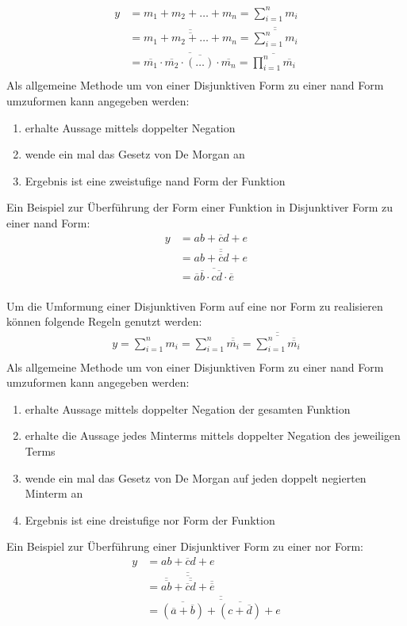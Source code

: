 \begin{align*}
	y &= m_1 + m_2 + \ldots + m_n = \sum_{i=1}^n m_i \\
	  &= \overline{\overline{m_1 + m_2 + \ldots + m_n}} = \overline{\overline{\sum_{i=1}^n m_i}} \\
	  &= \overline{\overline{m_1} \cdot \overline{m_2} \cdot \overline{(\ldots)} \cdot \overline{m_n}} 
	   = \overline{\prod_{i=1}^n \overline{m_i}} \\
\end{align*}
Als allgemeine Methode um von einer Disjunktiven Form zu einer {\sc nand} Form umzuformen kann angegeben werden:
\begin{enumerate}
  \item erhalte Aussage mittels doppelter Negation
  \item wende ein mal das Gesetz von De Morgan an
  \item Ergebnis ist eine zweistufige {\sc nand} Form der Funktion
\end{enumerate}
Ein Beispiel zur Überführung der Form einer Funktion in Disjunktiver Form zu einer {\sc nand} Form: 
\begin{align*}
	y &= ab + \overline{c}d + e \\
	  &= \overline{\overline{ab + \overline{c}d + e}} \\
	  &= \overline{\overline{a}\overline{b} \cdot c\overline{d} \cdot \overline{e}} \\
\end{align*}

Um die Umformung einer Disjunktiven Form auf eine {\sc nor} Form zu realisieren können folgende Regeln genutzt werden:
\begin{align*}
	y = \sum_{i=1}^n m_i = \sum_{i=1}^n \overline{\overline{m_i}} 
		= \overline{\overline{\sum_{i=1}^n \overline{\overline{m_i}}}} \\
\end{align*}
Als allgemeine Methode um von einer Disjunktiven Form zu einer {\sc nand} Form umzuformen kann angegeben werden:
\begin{enumerate}
  \item erhalte Aussage mittels doppelter Negation der gesamten Funktion
  \item erhalte die Aussage jedes Minterms mittels doppelter Negation des jeweiligen Terms
  \item wende ein mal das Gesetz von De Morgan auf jeden doppelt negierten Minterm an
  \item Ergebnis ist eine dreistufige {\sc nor} Form der Funktion
\end{enumerate}
Ein Beispiel zur Überführung einer Disjunktiver Form zu einer {\sc nor} Form: 
\begin{align*}
	y &= ab + \overline{c}d + e \\
	  &= \overline{\overline{\overline{\overline{ab}} + \overline{\overline{\overline{c}d}} 
	  	+ \overline{\overline{e}}}} \\	  
	  &= \overline{\overline{\overline{(\overline{a} + \overline{b})} + \overline{(c + \overline{d})} + e}} \\
\end{align*}

